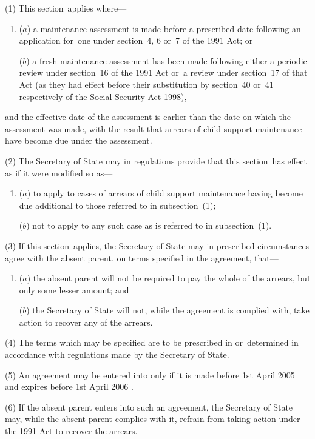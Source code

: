 \documentclass[12pt,a4paper]{article}
\begin{document}
(1) This section~applies where—
\begin{enumerate}\item[]
($a$) a maintenance assessment is made before a prescribed date following an application for~one under section~4, 6 or~7 of the 1991 Act; or

($b$) a fresh maintenance assessment has been made following either a periodic review under section~16 of the 1991 Act or~a review under section~17 of that Act (as they had effect before their substitution by section~40 or~41 respectively of the Social Security Act 1998),
\end{enumerate}
and the effective date of the assessment is earlier than the date on which the assessment was made, with the result that arrears of child support maintenance have become due under the assessment.

(2) The Secretary of State may in regulations provide that this section~has effect as if it were modified so as—
\begin{enumerate}\item[]
($a$) to apply to cases of arrears of child support maintenance having become due additional to those referred to in subsection~(1);

($b$) not to apply to any such case as is referred to in subsection~(1).
\end{enumerate}

(3) If this section~applies, the Secretary of State may in prescribed circumstances agree with the absent parent, on terms specified in the agreement, that—
\begin{enumerate}\item[]
($a$) the absent parent will not be required to pay the whole of the arrears, but only some lesser amount; and

($b$) the Secretary of State will not, while the agreement is complied with, take action to recover any of the arrears.
\end{enumerate}

(4) The terms which may be specified are to be prescribed in or~determined in accordance with regulations made by the Secretary of State.

(5) An agreement may be entered into only if it is made before 1st April 
2005  %
and expires before 1st April 
2006%
. 

(6) If the absent parent enters into such an agreement, the Secretary of State may, while the absent parent complies with it, refrain from taking action under the 1991 Act to recover the arrears.
\end{document}
